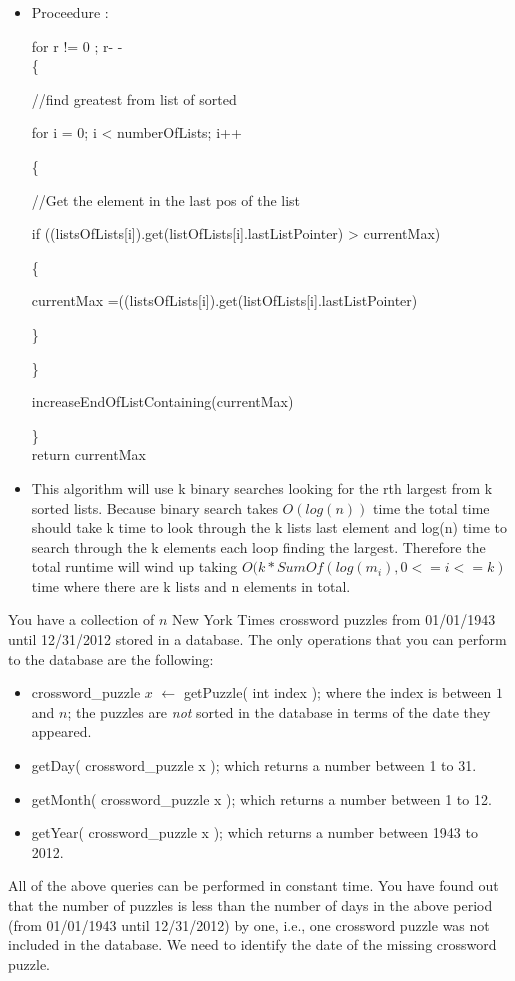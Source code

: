 \documentclass{article}
\begin{document}
\begin{enumerate}
\begin{itemize}
\item Proceedure : 

for r != 0 ; r- -\\
\{

\qquad //find greatest from list of sorted

\qquad for i = 0; i < numberOfLists; i++

\qquad \{

\qquad \qquad //Get the element in the last pos of the list

\qquad \qquad if ((listsOfLists[i]).get(listOfLists[i].lastListPointer) > currentMax)

\qquad \qquad \{

\qquad \qquad \qquad currentMax =((listsOfLists[i]).get(listOfLists[i].lastListPointer)

\qquad \qquad \}

\qquad \}

\qquad increaseEndOfListContaining(currentMax)

\}\\
return currentMax\\

\item This algorithm will use k binary searches looking for the rth largest from k sorted lists. Because binary search takes $O(log(n))$ time the total time should take k time to look through the k lists last element and log(n) time to search through the k elements each loop finding the largest. Therefore the total runtime will wind up taking $O(k * SumOf( log(m_{i}), 0 <= i <= k)$ time where there are k lists and n elements in total.
\end{itemize}

\end{enumerate}


 You have a collection of $n$ New York Times
crossword puzzles from 01/01/1943 until 12/31/2012 stored in a
database. The only operations that you can perform to the database are
the following:
\begin{itemize}
\item crossword\_puzzle $x$ $\leftarrow$ getPuzzle( int index ); where the
  index is between $1$ and $n$; the puzzles are \emph{not} sorted in the
  database in terms of the date they appeared.
\item getDay( crossword\_puzzle x ); which returns a number between 1
  to 31.
\item getMonth( crossword\_puzzle x ); which returns a number between
  1 to 12.
\item getYear( crossword\_puzzle x ); which returns a number between
  1943 to 2012.
\end{itemize}
All of the above queries can be performed in constant time. You have
found out that the number of puzzles is less than the number of days
in the above period (from 01/01/1943 until 12/31/2012) by one, i.e.,
one crossword puzzle was not included in the database. We need to
identify the date of the missing crossword puzzle.
\end{document}
